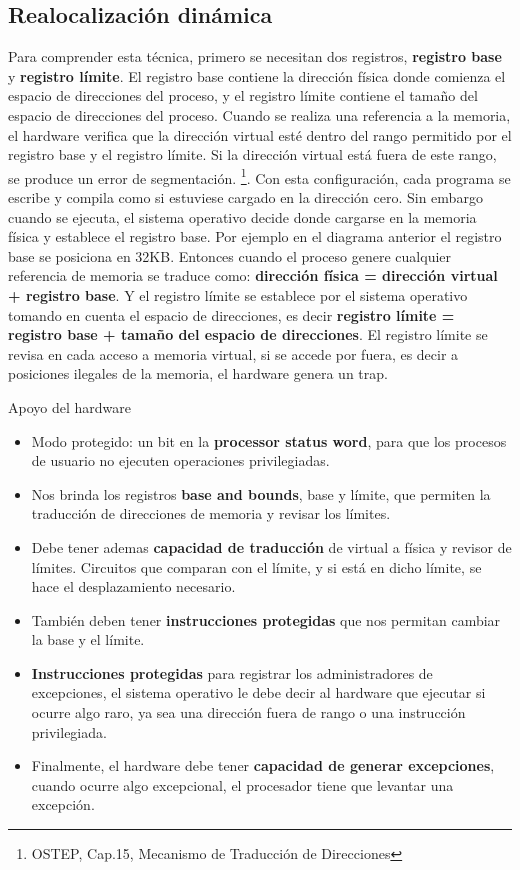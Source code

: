 \documentclass{article}
\begin{document}
\subsection{Realocalización dinámica}
Para comprender esta técnica, primero se necesitan dos registros, \textbf{registro base} y \textbf{registro límite}. El registro base contiene la dirección física donde comienza el espacio de direcciones del proceso, y el registro límite contiene el tamaño del espacio de direcciones del proceso. Cuando se realiza una referencia a la memoria, el hardware verifica que la dirección virtual esté dentro del rango permitido por el registro base y el registro límite. Si la dirección virtual está fuera de este rango, se produce un error de segmentación. \footnote{OSTEP, Cap.15, Mecanismo de Traducción de Direcciones}. Con esta configuración, cada programa se escribe y compila como si estuviese cargado en la dirección cero. Sin embargo cuando se ejecuta, el sistema operativo decide donde cargarse en la memoria física y establece el registro base. Por ejemplo en el diagrama anterior el registro base se posiciona en 32KB. Entonces cuando el proceso genere cualquier referencia de memoria se traduce como: \textbf{dirección física = dirección virtual + registro base}. Y el registro límite se establece por el sistema operativo tomando en cuenta el espacio de direcciones, es decir \textbf{registro límite = registro base + tamaño del espacio de direcciones}. El registro límite se revisa en cada acceso a memoria virtual, si se accede por fuera, es decir a posiciones ilegales de la memoria, el hardware genera un trap.

\begin{summary}{Apoyo del hardware}
    \begin{itemize}
        \item Modo protegido: un bit en la \textbf{processor status word}, para que los procesos de usuario no ejecuten operaciones privilegiadas.
        \item Nos brinda los registros \textbf{base and bounds}, base y límite, que permiten la traducción de direcciones de memoria y revisar los límites.
        \item Debe tener ademas \textbf{capacidad de traducción} de virtual a física y revisor de límites. Circuitos que comparan con el límite, y si está en dicho límite, se hace el desplazamiento necesario.
        \item También deben tener \textbf{instrucciones protegidas} que nos permitan cambiar la base y el límite.
        \item \textbf{Instrucciones protegidas} para registrar los administradores de excepciones, el sistema operativo le debe decir al hardware que ejecutar si ocurre algo raro, ya sea una dirección fuera de rango o una instrucción privilegiada.
        \item Finalmente, el hardware debe tener \textbf{capacidad de generar excepciones}, cuando ocurre algo excepcional, el procesador tiene que levantar una excepción.
    \end{itemize}
\end{summary}
\end{document}
